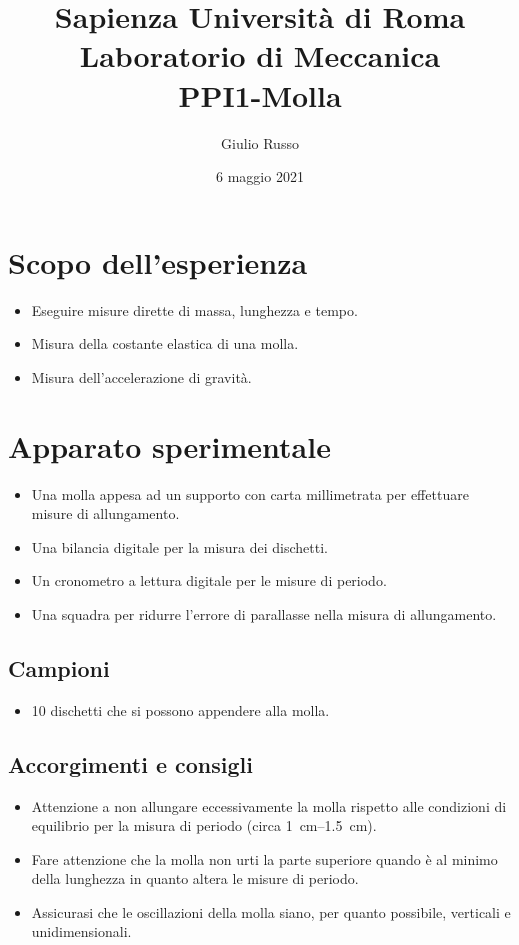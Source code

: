 \documentclass[titlepage]{article}
\title{Sapienza Università di Roma\\[1ex]Laboratorio di Meccanica\\[1ex]PPI1-Molla}
\author{Giulio Russo}
\date{6 maggio 2021}
\numberwithin{equation}{section}
\numberwithin{figure}{section}
\numberwithin{table}{section}
\begin{document}
\maketitle
\tableofcontents

\pagebreak
\section{Scopo dell'esperienza}

\begin{itemize}
  \item Eseguire misure dirette di massa, lunghezza e tempo.
  \item Misura della costante elastica di una molla.
  \item Misura dell'accelerazione di gravità.
\end{itemize}

\section{Apparato sperimentale}

\begin{itemize}
  \item Una molla appesa ad un supporto con carta millimetrata per effettuare misure di allungamento.
  \item Una bilancia digitale per la misura dei dischetti.
  \item Un cronometro a lettura digitale per le misure di periodo.
  \item Una squadra per ridurre l'errore di parallasse nella misura di allungamento.
\end{itemize}

\subsection{Campioni}

\begin{itemize}
  \item 10 dischetti che si possono appendere alla molla.
\end{itemize}

\subsection{Accorgimenti e consigli}

\begin{itemize}
  \item Attenzione a non allungare eccessivamente la molla rispetto alle condizioni di equilibrio per la misura di periodo (circa \SIrange{1}{1.5}{\centi\metre}).
  \item Fare attenzione che la molla non urti la parte superiore quando è al minimo della lunghezza in quanto altera le misure di periodo.
  \item Assicurasi che le oscillazioni della molla siano, per quanto possibile, verticali e unidimensionali.
\end{itemize}
\end{document}
